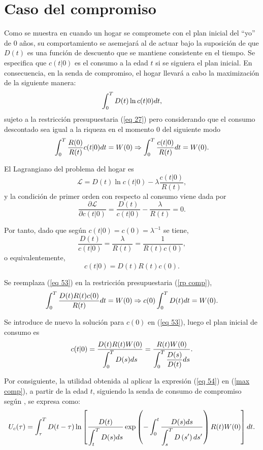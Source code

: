 \section{Caso del compromiso}
Como se muestra en \parencite{feigenbaum2021deviation} cuando un hogar se compromete con el plan inicial del “yo” de $0$ años, su comportamiento se asemejará al de actuar bajo la suposición de que $D(t)$ es una función de descuento que se mantiene consistente en el tiempo. Se especifica que $c(t|0)$ es el consumo a la edad $t$ si se siguiera el plan inicial. En consecuencia, en la senda de compromiso, el hogar llevará a cabo la maximización de la siguiente manera:
\begin{equation}
\label{max comp}
    \displaystyle \int_0^T D(t) \ln c(t|0) dt,
\end{equation}
sujeto a la restricción presupuestaria (\ref{eq 27}) pero considerando que el consumo descontado sea igual a la riqueza en el momento 0 del siguiente modo
\begin{equation}
\label{rp comp}
\displaystyle \int_0^T \dfrac{R(0)}{R(t)}c(t|0)dt=W(0) \Rightarrow
\displaystyle \int_0^T \dfrac{c(t|0)}{R(t)}dt = W(0).
\end{equation}

\noindent El Lagrangiano del problema del hogar es
$$\mathcal{L}=D(t) \ln c(t|0) - \lambda \dfrac{c(t|0)}{R(t)},$$
y la condición de primer orden con respecto al consumo viene dada por
$$\dfrac{\partial \mathcal{L}}{\partial c(t|0)}= \dfrac{D(t)}{c(t|0)}- \dfrac{\lambda}{R(t)}=0.$$


\noindent Por tanto, dado que según \parencite{feigenbaum2021deviation} $c(t|0) = c(0) = \lambda^{-1}$ se tiene,
$$\dfrac{D(t)}{c(t|0)}= \dfrac{\lambda}{R(t)}=
 \dfrac{1}{R(t)c(0)},$$
 o equivalentemente,
\begin{equation}
\label{eq 53}
    c(t|0)=D(t)R(t)c(0).
\end{equation}

Se reemplaza (\ref{eq 53}) en la restricción presupuestaria (\ref{rp comp}),
$$\displaystyle \int_0^T \dfrac{D(t)R(t)c(0)}{R(t)}dt = W(0) \Rightarrow
c(0) \displaystyle \int_0^T D(t)dt=W(0).$$

\noindent Se introduce de nuevo la solución para $c(0)$ en (\ref{eq 53}), luego el plan inicial de consumo es
\begin{equation}
\label{eq 54}
    c(t|0)=\dfrac{D(t)R(t)W(0)}{\displaystyle \int_0^T D(s)ds}=\dfrac{R(t)W(0)}{\displaystyle \int_0^T \dfrac{D(s)}{D(t)}ds}. 
\end{equation}

Por consiguiente, la utilidad obtenida al aplicar la expresión (\ref{eq 54}) en (\ref{max comp}), a partir de la edad $t$, siguiendo la senda de consumo de compromiso según \parencite{feigenbaum2021deviation}, se expresa como:
\begin{equation}
\label{eq 55}
U_c(\tau)=\displaystyle \int_\tau^T D(t-\tau) \ln \left[\dfrac{D(t)}{\displaystyle \int_t^T D(s) d s} \exp \left(-\displaystyle \int_0^t \dfrac{D(s) d s}{\displaystyle \int_s^T D\left(s^{\prime}\right) d s^{\prime}}\right) R(t) W(0)\right] d t.
\end{equation}

